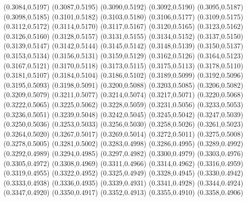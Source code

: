 \PST@Cross(0.3084,0.5197)
\PST@Cross(0.3087,0.5195)
\PST@Cross(0.3090,0.5192)
\PST@Cross(0.3092,0.5190)
\PST@Cross(0.3095,0.5187)
\PST@Cross(0.3098,0.5185)
\PST@Cross(0.3101,0.5182)
\PST@Cross(0.3103,0.5180)
\PST@Cross(0.3106,0.5177)
\PST@Cross(0.3109,0.5175)
\PST@Cross(0.3112,0.5172)
\PST@Cross(0.3114,0.5170)
\PST@Cross(0.3117,0.5167)
\PST@Cross(0.3120,0.5165)
\PST@Cross(0.3123,0.5162)
\PST@Cross(0.3126,0.5160)
\PST@Cross(0.3128,0.5157)
\PST@Cross(0.3131,0.5155)
\PST@Cross(0.3134,0.5152)
\PST@Cross(0.3137,0.5150)
\PST@Cross(0.3139,0.5147)
\PST@Cross(0.3142,0.5144)
\PST@Cross(0.3145,0.5142)
\PST@Cross(0.3148,0.5139)
\PST@Cross(0.3150,0.5137)
\PST@Cross(0.3153,0.5134)
\PST@Cross(0.3156,0.5131)
\PST@Cross(0.3159,0.5129)
\PST@Cross(0.3162,0.5126)
\PST@Cross(0.3164,0.5123)
\PST@Cross(0.3167,0.5121)
\PST@Cross(0.3170,0.5118)
\PST@Cross(0.3173,0.5115)
\PST@Cross(0.3175,0.5113)
\PST@Cross(0.3178,0.5110)
\PST@Cross(0.3181,0.5107)
\PST@Cross(0.3184,0.5104)
\PST@Cross(0.3186,0.5102)
\PST@Cross(0.3189,0.5099)
\PST@Cross(0.3192,0.5096)
\PST@Cross(0.3195,0.5093)
\PST@Cross(0.3198,0.5091)
\PST@Cross(0.3200,0.5088)
\PST@Cross(0.3203,0.5085)
\PST@Cross(0.3206,0.5082)
\PST@Cross(0.3209,0.5079)
\PST@Cross(0.3211,0.5077)
\PST@Cross(0.3214,0.5074)
\PST@Cross(0.3217,0.5071)
\PST@Cross(0.3220,0.5068)
\PST@Cross(0.3222,0.5065)
\PST@Cross(0.3225,0.5062)
\PST@Cross(0.3228,0.5059)
\PST@Cross(0.3231,0.5056)
\PST@Cross(0.3233,0.5053)
\PST@Cross(0.3236,0.5051)
\PST@Cross(0.3239,0.5048)
\PST@Cross(0.3242,0.5045)
\PST@Cross(0.3245,0.5042)
\PST@Cross(0.3247,0.5039)
\PST@Cross(0.3250,0.5036)
\PST@Cross(0.3253,0.5033)
\PST@Cross(0.3256,0.5030)
\PST@Cross(0.3258,0.5026)
\PST@Cross(0.3261,0.5023)
\PST@Cross(0.3264,0.5020)
\PST@Cross(0.3267,0.5017)
\PST@Cross(0.3269,0.5014)
\PST@Cross(0.3272,0.5011)
\PST@Cross(0.3275,0.5008)
\PST@Cross(0.3278,0.5005)
\PST@Cross(0.3281,0.5002)
\PST@Cross(0.3283,0.4998)
\PST@Cross(0.3286,0.4995)
\PST@Cross(0.3289,0.4992)
\PST@Cross(0.3292,0.4989)
\PST@Cross(0.3294,0.4985)
\PST@Cross(0.3297,0.4982)
\PST@Cross(0.3300,0.4979)
\PST@Cross(0.3303,0.4976)
\PST@Cross(0.3305,0.4972)
\PST@Cross(0.3308,0.4969)
\PST@Cross(0.3311,0.4966)
\PST@Cross(0.3314,0.4962)
\PST@Cross(0.3316,0.4959)
\PST@Cross(0.3319,0.4955)
\PST@Cross(0.3322,0.4952)
\PST@Cross(0.3325,0.4949)
\PST@Cross(0.3328,0.4945)
\PST@Cross(0.3330,0.4942)
\PST@Cross(0.3333,0.4938)
\PST@Cross(0.3336,0.4935)
\PST@Cross(0.3339,0.4931)
\PST@Cross(0.3341,0.4928)
\PST@Cross(0.3344,0.4924)
\PST@Cross(0.3347,0.4920)
\PST@Cross(0.3350,0.4917)
\PST@Cross(0.3352,0.4913)
\PST@Cross(0.3355,0.4910)
\PST@Cross(0.3358,0.4906)
